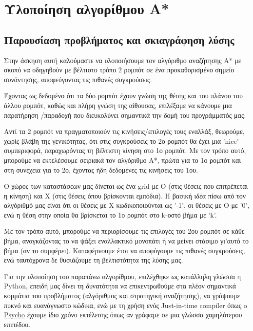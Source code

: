 \documentclass[a4paper,12pt]{article}
\begin{document}


\section*{Υλοποίηση αλγορίθμου A*} \setcounter{section}{1}
\subsection{Παρουσίαση προβλήματος και σκιαγράφηση λύσης}
Στην άσκηση αυτή καλούμαστε να υλοποιήσουμε τον αλγόριθμο αναζήτησης Α* με
σκοπό να οδηγηθούν με βέλτιστο τρόπο 2 ρομπότ σε ένα προκαθορισμένο σημείο
συνάντησης, αποφεύγοντας τις πιθανές συγκρούσεις.

Έχοντας ως δεδομένο ότι τα δύο ρομπότ έχουν γνώση της θέσης και του
πλάνου του άλλου ρομπότ, καθώς και πλήρη γνώση της αίθουσας, επιλέξαμε να
κάνουμε μια παρατήρηση /παραδοχή που διευκολύνει σημαντικά την δομή του
προγράμματός μας:

Αντί τα 2 ρομπότ να πραγματοποιούν τις κινήσεις/επιλογές τους εναλλάξ,
θεωρούμε, χωρίς βλάβη της γενικότητας, ότι στις συγκρούσεις το 2ο ρομπότ θα
έχει μια 'nice' συμπεριφορά, παραχωρόντας τη βέλτιστη κίνηση στο 1ο ρομπότ. Με
τον τρόπο αυτό, μπορούμε να εκτελέσουμε σειριακά τον αλγόριθμο A*, πρώτα για
το 1ο ρομπότ και στη συνέχεια για το 2ο, έχοντας ήδη δεδομένες τις κινήσεις
του 1ου.

Ο χώρος των καταστάσεων μας δίνεται ως ένα grid με Ο (στις θέσεις που
επιτρέπεται η κίνηση) και Χ (στις θέσεις όπου βρίσκονται εμπόδια). Η βασική
ιδέα πίσω από τον αλγόριθμό μας είναι ότι οι θέσεις με Χ κωδικοποιούνται ως
'-1', οι θέσεις με O με '0', ενώ η θέση στην οποία θα βρίσκεται το 1ο ρομπότ
στο k-οστό βήμα με 'k'.

Με τον τρόπο αυτό, μπορούμε να περιορίσουμε τις επιλογές του 2ου ρομπότ σε
κάθε βήμα, αναγκάζοντας το να ψάξει εναλλακτικό μονοπάτι ή να μείνει στάσιμο
γι'αυτό το βήμα (αν το συμφέρει). Καταφέρνουμε έτσι να αποφύγουμε τις πιθανές
συγκρούσεις, ενώ ταυτόχρονα δε θυσιάζουμε τη βελτιστότητα της λύσης μας.

Για την υλοποίηση του παραπάνω αλγορίθμου, επιλέχθηκε ως κατάλληλη γλώσσα η
Python, επειδή μας δίνει τη δυνατότητα να επικεντρωθούμε στα πλέον σημαντικά
κομμάτια του προβλήματος (αλγόριθμος και στρατηγική αναζήτησης), να γράψουμε
πυκνό και ευανάγνωστο κώδικα, ενώ με τη χρήση ενός Just-in-time compiler όπως
o \underline{\href{http://psyco.sourceforge.net/}{Psycho}} έχουμε ίδιο χρόνο
εκτέλεσης όπως αν γράφαμε σε μια γλώσσα χαμηλότερου επιπέδου.
\end{document}
